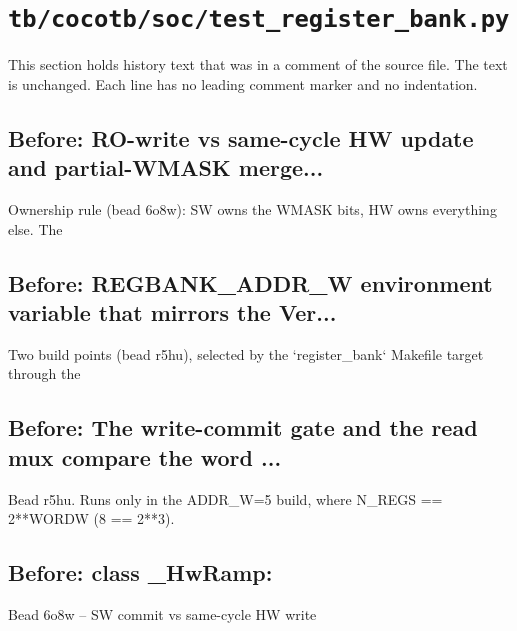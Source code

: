 \section{\texttt{tb/cocotb/soc/test\_register\_bank.py}}\label{cr:suite:soc-test-register-bank}

This section holds history text that was in a comment of the source file. The text is unchanged. Each line has no leading comment marker and no indentation.

\begin{record}

\subsection*{Before: RO-write vs same-cycle HW update and partial-WMASK merge...}

\begin{textblock}
Ownership rule (bead 6o8w): SW owns the WMASK bits, HW owns everything else.  The
\end{textblock}

\subsection*{Before: REGBANK\_ADDR\_W environment variable that mirrors the Ver...}

\begin{textblock}
Two build points (bead r5hu), selected by the `register_bank` Makefile target through the
\end{textblock}

\subsection*{Before: The write-commit gate and the read mux compare the word ...}

\begin{textblock}
Bead r5hu.  Runs only in the ADDR_W=5 build, where N_REGS == 2**WORDW (8 == 2**3).
\end{textblock}

\subsection*{Before: class \_HwRamp:}

\begin{textblock}
Bead 6o8w -- SW commit vs same-cycle HW write
\end{textblock}


\end{record}
